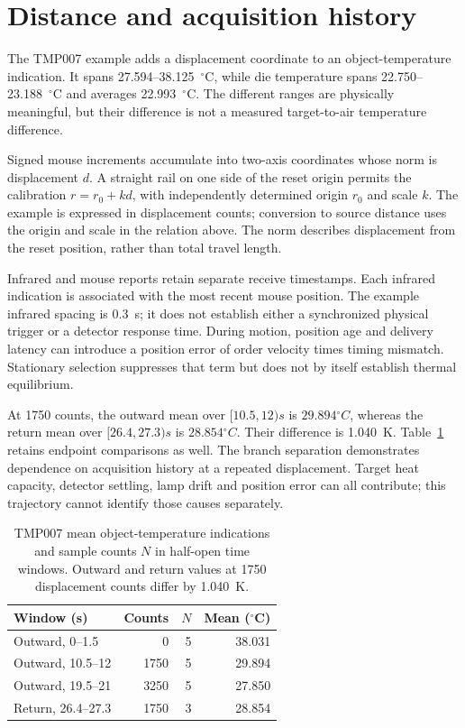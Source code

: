 \section{Distance and acquisition history}
The TMP007 example adds a displacement coordinate to an object-temperature indication. It spans 27.594--38.125~$^\circ$C, while die temperature spans 22.750--23.188~$^\circ$C and averages 22.993~$^\circ$C. The different ranges are physically meaningful, but their difference is not a measured target-to-air temperature difference.

Signed mouse increments accumulate into two-axis coordinates whose norm is displacement $d$. A straight rail on one side of the reset origin permits the calibration $r=r_0+kd$, with independently determined origin $r_0$ and scale $k$. The example is expressed in displacement counts; conversion to source distance uses the origin and scale in the relation above. The norm describes displacement from the reset position, rather than total travel length.

Infrared and mouse reports retain separate receive timestamps. Each infrared indication is associated with the most recent mouse position. The example infrared spacing is 0.3~s; it does not establish either a synchronized physical trigger or a detector response time. During motion, position age and delivery latency can introduce a position error of order velocity times timing mismatch. Stationary selection suppresses that term but does not by itself establish thermal equilibrium.

At 1750 counts, the outward mean over $[10.5,12)\unit{s}$ is $29.894\unit{^\circ C}$, whereas the return mean over $[26.4,27.3)\unit{s}$ is $28.854\unit{^\circ C}$. Their difference is 1.040~K. Table~\ref{tab:ir-distance-branches} retains endpoint comparisons as well. The branch separation demonstrates dependence on acquisition history at a repeated displacement. Target heat capacity, detector settling, lamp drift and position error can all contribute; this trajectory cannot identify those causes separately.

\begin{table}[t]
\caption{TMP007 mean object-temperature indications and sample counts $N$ in half-open time windows. Outward and return values at 1750 displacement counts differ by 1.040~K.}
\label{tab:ir-distance-branches}
\centering\small
\begin{tabular}{@{}lrrr@{}}
\toprule
Window (s) & Counts & $N$ & Mean ($^\circ$C)\\
\midrule
Outward, 0--1.5 & 0 & 5 & 38.031\\
Outward, 10.5--12 & 1750 & 5 & 29.894\\
Outward, 19.5--21 & 3250 & 5 & 27.850\\
Return, 26.4--27.3 & 1750 & 3 & 28.854\\
\bottomrule
\end{tabular}
\end{table}

